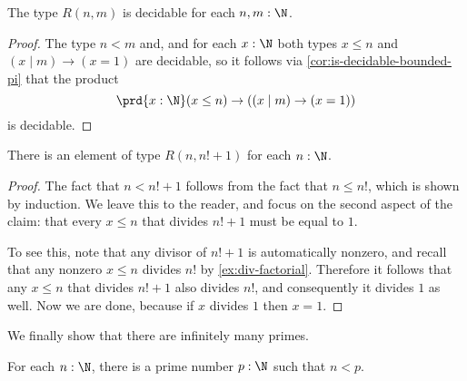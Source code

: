\begin{lem}
  The type $R(n,m)$ is decidable for each $n,m:\N$.
\end{lem}

\begin{proof}
  The type $n<m$ and, and for each $x:\N$ both types $x\leq n$ and $(x\mid m)\to (x=1)$ are decidable, so it follows via \cref{cor:is-decidable-bounded-pi} that the product
  \begin{equation*}
    \prd{x:\N}(x\leq n)\to ((x\mid m)\to (x=1))
  \end{equation*}
  is decidable.
\end{proof}

\begin{lem}\label{lem:succ-factorial-has-one-bounded-divisor}
  There is an element of type $R(n,{n!}+1)$ for each $n:\N$.
\end{lem}

\begin{proof}
  The fact that $n<{n!}+1$ follows from the fact that $n\leq n!$, which is shown by induction. We leave this to the reader, and focus on the second aspect of the claim: that every $x\leq n$ that divides ${n!}+1$ must be equal to $1$.

  To see this, note that any divisor of ${n!}+1$ is automatically nonzero, and recall that any nonzero $x\leq n$ divides $n!$ by \cref{ex:div-factorial}. Therefore it follows that any $x\leq n$ that divides ${n!}+1$ also divides $n!$, and consequently it divides $1$ as well. Now we are done, because if $x$ divides $1$ then $x=1$.
\end{proof}

We finally show that there are infinitely many primes.

\begin{thm}
  For each $n:\N$, there is a prime number $p:\N$ such that $n< p$.
\end{thm}

